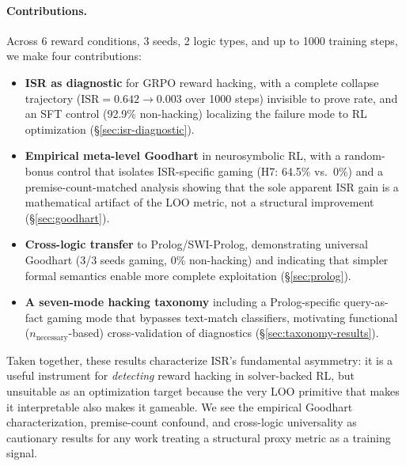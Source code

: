 \paragraph{Contributions.}
Across 6 reward conditions, 3 seeds, 2 logic types, and up to 1000 training steps, we make four contributions:
\begin{itemize}[nosep,leftmargin=*]
\item[\textbf{C1.}] \textbf{ISR as diagnostic} for GRPO reward hacking, with a complete collapse trajectory ($\text{ISR}{=}0.642{\to}0.003$ over 1000 steps) invisible to prove rate, and an SFT control (92.9\% non-hacking) localizing the failure mode to RL optimization (\S\ref{sec:isr-diagnostic}).
\item[\textbf{C2.}] \textbf{Empirical meta-level Goodhart} in neurosymbolic RL, with a random-bonus control that isolates ISR-specific gaming (H7: 64.5\% vs.\ 0\%) and a premise-count-matched analysis showing that the sole apparent ISR gain is a mathematical artifact of the LOO metric, not a structural improvement (\S\ref{sec:goodhart}).
\item[\textbf{C3.}] \textbf{Cross-logic transfer} to Prolog/SWI-Prolog, demonstrating universal Goodhart (3/3 seeds gaming, 0\% non-hacking) and indicating that simpler formal semantics enable more complete exploitation (\S\ref{sec:prolog}).
\item[\textbf{C4.}] \textbf{A seven-mode hacking taxonomy} including a Prolog-specific query-as-fact gaming mode that bypasses text-match classifiers, motivating functional ($n_{\text{necessary}}$-based) cross-validation of diagnostics (\S\ref{sec:taxonomy-results}).
\end{itemize}
Taken together, these results characterize ISR's fundamental asymmetry: it is a useful instrument for \emph{detecting} reward hacking in solver-backed RL, but unsuitable as an optimization target because the very LOO primitive that makes it interpretable also makes it gameable.
We see the empirical Goodhart characterization, premise-count confound, and cross-logic universality as cautionary results for any work treating a structural proxy metric as a training signal.
